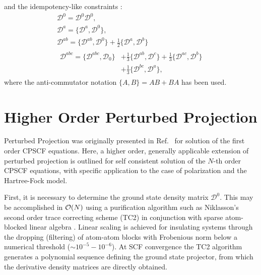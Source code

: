 \documentclass[prl,aps,letterpaper,twocolumn,showpacs,twocolumngrid,superbib]{revtex4}
\def\F{\mathcal{F}}
\def\D{\mathcal{D}}
\begin{document}
and the idempotency-like constraints \cite{Furche_2001}:
\begin{gather}
  \D^{0} =\D^{0} \D^{0},\label{eq:anticommutators1}\\
  \D^{a} =\{\D^{a},\D^{0}\},\label{eq:anticommutators2}\\
  \D^{ab}=\{\D^{ab},\D^{0}\}+\frac{1}{2}\{\D^{a},\D^{b}\}\label{eq:anticommutators3}\\
  \begin{split}
    \D^{abc}=\{\D^{abc},\D_0\}&+\frac{1}{3}\{\D^{ab},\D^{c}\}+\frac{1}{3}\{\D^{ac},\D^{b}\}\\
    &+\frac{1}{3}\{\D^{bc},\D^{a}\}\label{eq:anticommutators4},
  \end{split}
\end{gather}
where the anti-commutator notation $\{A,B\} = AB+BA$ has been used.



\section{Higher Order Perturbed Projection}

Perturbed Projection was originally presented in Ref.~
for solution of the first order CPSCF equations.  Here, a higher order, generally applicable 
extension of perturbed projection is outlined for self consistent solution 
of the $N$-th order CPSCF equations, with specific application to the case of polarization and the
Hartree-Fock  model.  

First, it is necessary to determine the ground state density matrix $\mathcal{D}^0$.  This may 
be accomplished in ${\cal O}(N)$ using a purification algorithm such as Niklasson's \cite{ANiklasson02A} 
second order trace correcting scheme (TC2) in conjunction with sparse atom-blocked linear algebra 
\cite{ANiklasson03,MChallacombe00B}.  Linear scaling is achieved for insulating systems through 
the dropping (filtering) of atom-atom blocks with Frobenious norm below a numerical threshold 
($\sim 10^{-5}-10^{-6}$).  At SCF convergence the TC2 algorithm generates a polynomial sequence 
defining the ground state projector, from which the derivative density matrices are directly obtained.
\end{document}
